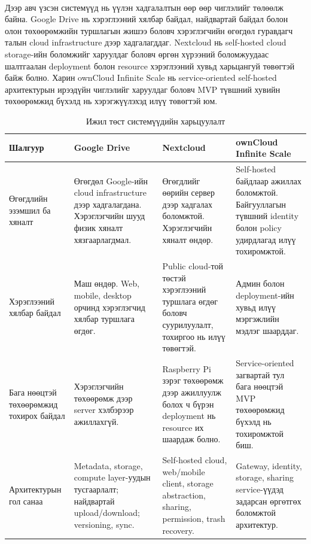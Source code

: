 \paragraph{}
Дээр авч үзсэн системүүд нь үүлэн хадгалалтын өөр өөр чиглэлийг төлөөлж байна. Google Drive нь хэрэглээний хялбар байдал, найдвартай байдал болон олон төхөөрөмжийн туршлагын жишээ боловч хэрэглэгчийн өгөгдөл гуравдагч талын cloud infrastructure дээр хадгалагддаг. Nextcloud нь self-hosted cloud storage-ийн боломжийг харуулдаг боловч өргөн хүрээний боломжуудаас шалтгаалан deployment болон resource хэрэглээний хувьд харьцангуй төвөгтэй байж болно. Харин ownCloud Infinite Scale нь service-oriented self-hosted архитектурын ирээдүйн чиглэлийг харуулдаг боловч MVP түвшний хувийн төхөөрөмжид бүхэлд нь хэрэгжүүлэхэд илүү төвөгтэй юм.

\begin{table}[H]
\centering
\caption{Ижил төст системүүдийн харьцуулалт}
\label{tab:similar-systems-comparison}
\begin{tabular}{|p{3.2cm}|p{3.6cm}|p{3.6cm}|p{4.0cm}|}
\hline
\textbf{Шалгуур} & \textbf{Google Drive} & \textbf{Nextcloud} & \textbf{ownCloud Infinite Scale} \\ \hline

Өгөгдлийн эзэмшил ба хяналт &
Өгөгдөл Google-ийн cloud infrastructure дээр хадгалагдана. Хэрэглэгчийн шууд физик хяналт хязгаарлагдмал. &
Өгөгдлийг өөрийн сервер дээр хадгалах боломжтой. Хэрэглэгчийн хяналт өндөр. &
Self-hosted байдлаар ажиллах боломжтой. Байгууллагын түвшний identity болон policy удирдлагад илүү тохиромжтой. \\ \hline

Хэрэглээний хялбар байдал &
Маш өндөр. Web, mobile, desktop орчинд хэрэглэгчид хялбар туршлага өгдөг. &
Public cloud-той төстэй хэрэглээний туршлага өгдөг боловч суурилуулалт, тохиргоо нь илүү төвөгтэй. &
Админ болон deployment-ийн хувьд илүү мэргэжлийн мэдлэг шаарддаг. \\ \hline

Бага нөөцтэй төхөөрөмжид тохирох байдал &
Хэрэглэгчийн төхөөрөмж дээр server хэлбэрээр ажиллахгүй. &
Raspberry Pi зэрэг төхөөрөмж дээр ажиллуулж болох ч бүрэн deployment нь resource их шаардаж болно. &
Service-oriented загвартай тул бага нөөцтэй MVP төхөөрөмжид бүхэлд нь тохиромжтой биш. \\ \hline

Архитектурын гол санаа &
Metadata, storage, compute layer-уудын тусгаарлалт; найдвартай upload/download; versioning, sync. &
Self-hosted cloud, web/mobile client, storage abstraction, sharing, permission, trash recovery. &
Gateway, identity, storage, sharing service-үүдэд задарсан өргөтгөх боломжтой архитектур. \\ \hline


\end{tabular}
\end{table}
